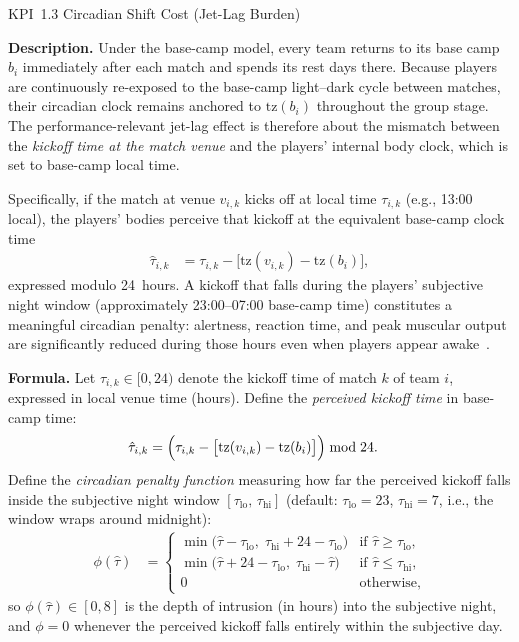 \documentclass[12pt, letterpaper]{article}
\newcommand{\kpilabel}[1]{\noindent\textbf{#1}\enspace}
\begin{document}
\begin{kpibox}{KPI~1.3 \textendash{} Circadian Shift Cost (Jet-Lag Burden)}

\kpilabel{Description.}
Under the base-camp model, every team returns to its base camp $b_i$
immediately after each match and spends its rest days there.  Because
players are continuously re-exposed to the base-camp light--dark cycle
between matches, their circadian clock remains anchored to
$\mathrm{tz}(b_i)$ throughout the group stage.  The performance-relevant
jet-lag effect is therefore about the mismatch between the \emph{kickoff time at the
match venue} and the players' internal body clock, which is set to
base-camp local time.

Specifically, if the match at venue $v_{i,k}$ kicks off at local time
$\tau_{i,k}$ (e.g., 13:00 local), the players' bodies perceive that
kickoff at the equivalent base-camp clock time
\begin{align*}
  \hat{\tau}_{i,k} &= \tau_{i,k}
    - \bigl[\mathrm{tz}(v_{i,k}) - \mathrm{tz}(b_i)\bigr],
\end{align*}
expressed modulo 24~hours.  A kickoff that falls during the players'
subjective night window (approximately 23:00--07:00 base-camp time)
constitutes a meaningful circadian penalty: alertness, reaction time,
and peak muscular output are significantly reduced during those hours
even when players appear awake~\citep{Recht1995}.

\medskip
\kpilabel{Formula.}
Let $\tau_{i,k} \in [0,24)$ denote the kickoff time of match $k$ of
team $i$, expressed in local venue time (hours).  Define the
\emph{perceived kickoff time} in base-camp time:
\begin{align*}
  \hat{\tau}_{i,k} &= \Bigl(\tau_{i,k}
    - \bigl[\mathrm{tz}(v_{i,k}) - \mathrm{tz}(b_i)\bigr]\Bigr)
    \bmod 24.
\end{align*}
Define the \emph{circadian penalty function} measuring how far the
perceived kickoff falls inside the subjective night window
$[\tau_{\mathrm{lo}},\, \tau_{\mathrm{hi}}]$
(default: $\tau_{\mathrm{lo}} = 23$, $\tau_{\mathrm{hi}} = 7$,
i.e., the window wraps around midnight):
\begin{align*}
  \phi(\hat{\tau}) &= \begin{cases}
    \min\!\bigl(\hat{\tau} - \tau_{\mathrm{lo}},\;
                \tau_{\mathrm{hi}} + 24 - \tau_{\mathrm{lo}}\bigr)
      & \text{if } \hat{\tau} \geq \tau_{\mathrm{lo}}, \\[4pt]
    \min\!\bigl(\hat{\tau} + 24 - \tau_{\mathrm{lo}},\;
                \tau_{\mathrm{hi}} - \hat{\tau}\bigr)
      & \text{if } \hat{\tau} \leq \tau_{\mathrm{hi}}, \\[4pt]
    0 & \text{otherwise,}
  \end{cases}
\end{align*}
so $\phi(\hat{\tau}) \in [0,8]$ is the depth of intrusion (in hours)
into the subjective night, and $\phi = 0$ whenever the perceived
kickoff falls entirely within the subjective day.


\end{kpibox}
\end{document}
